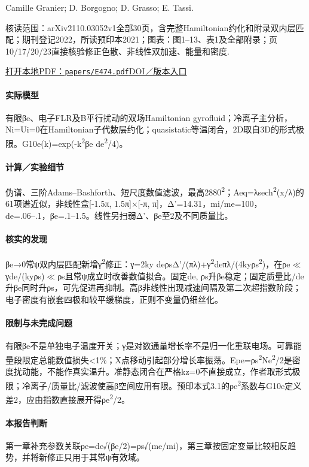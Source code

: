 Camille Granier;  D. Borgogno;  D. Grasso;  E. Tassi.

\textsf{核读范围：}arXiv2110.03052v1全部30页，含完整Hamiltonian约化和附录双内层匹配；期刊登记2022，所读预印本2021；\textsf{图表：}图1–13、表1及全部附录；页10/17/20/23直接核验修正色散、非线性双加速、能量和密度.

\href{run:papers/E474.pdf}{打开本地PDF：\texttt{papers/E474.pdf}}\quad\href{https://doi.org/10.1017/s0022377822000010}{DOI／版本入口}

\paragraph{实际模型}有限βe、电子FLR及B平行扰动的双场Hamiltonian gyrofluid；冷离子主分析，Ni=Ui=0在Hamiltonian子代数层约化；quasistatic等温闭合，2D取自3D的形式极限。G10e(k)=exp(-k\textsuperscript{2}βe de\textsuperscript{2}/4)。

\paragraph{计算／实验细节}伪谱、三阶Adams–Bashforth、短尺度数值滤波，最高2880\textsuperscript{2}；Aeq=λsech\textsuperscript{2}(x/λ)的61项谱近似，非线性盒[-1.5π, 1.5π]×[-π, π]，Δ'=14.31，mi/me=100，de=.06–.1，βe=.1–1.5。线性另扫弱Δ'、βe至2及不同质量比。

\paragraph{核实的发现}βe→0常ψ双内层匹配新增γ\textsuperscript{2}修正：γ=2ky deρsΔ'/(πλ)+γ\textsuperscript{2}deπλ/(4kyρs\textsuperscript{2})，在ρe\ensuremath{\ll}γde/(kyρs)\ensuremath{\ll}ρs且常ψ成立时改善数值拟合。固定de, ρs升βe稳定；固定质量比/de升βe同时升ρs，可先促进再抑制。高β非线性出现减速间隔及第二次超指数阶段；电子密度有嵌套四极和较平缓梯度，正则不变量仍细丝化。

\paragraph{限制与未完成问题}有限βe不是单独电子温度开关；γ是对数通量增长率不是归一化重联电场。可靠能量段限定总能数值损失<1\%；X点移动引起部分增长率振荡。Epe=ρs\textsuperscript{2}Ne\textsuperscript{2}/2是密度扰动能，不能作真实温升。准静态闭合在严格kz=0不直接成立，作者取形式极限；冷离子/质量比/滤波使高β空间应用有限。预印本式3.1的ρe\textsuperscript{2}系数与G10e定义差2，应由指数直接展开得ρe\textsuperscript{2}/2。

\paragraph{本报告判断}第一章补充参数关联ρe=de√(βe/2)=ρs√(me/mi)，第三章按固定变量比较相反趋势，并将新修正只用于其常ψ有效域。

